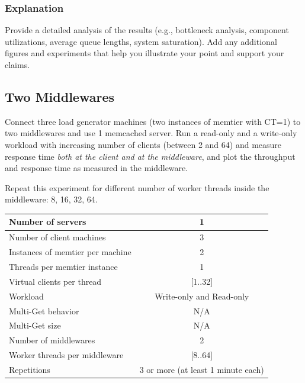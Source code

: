 \documentclass[11pt,a4paper]{article}
\begin{document}
\subsubsection{Explanation}

Provide a detailed analysis of the results (e.g., bottleneck analysis, component utilizations, average queue lengths, system saturation). Add any additional figures and experiments that help you illustrate your point and support your claims.

\subsection{Two Middlewares}

Connect three load generator machines (two instances of memtier with CT=1) to two middlewares and use 1 memcached server. Run a read-only and a write-only workload with increasing number of clients (between 2 and 64) and measure response time \emph{both at the client and at the middleware}, and plot the throughput and response time as measured in the middleware.

Repeat this experiment for different number of worker threads inside the middleware: 8, 16, 32, 64.

\begin{center}
	\scriptsize{
		\begin{tabular}{|l|c|}
			\hline Number of servers                & 1                        \\ 
			\hline Number of client machines        & 3                        \\ 
			\hline Instances of memtier per machine & 2                        \\ 
			\hline Threads per memtier instance     & 1                        \\
			\hline Virtual clients per thread       & [1..32]                  \\ 
			\hline Workload                         & Write-only and Read-only \\
			\hline Multi-Get behavior               & N/A                      \\
			\hline Multi-Get size                   & N/A                      \\
			\hline Number of middlewares            & 2                        \\
			\hline Worker threads per middleware    & [8..64]                  \\
			\hline Repetitions                      & 3 or more (at least 1 minute each)                \\ 
			\hline 
		\end{tabular}
	} 
\end{center}
\end{document}
